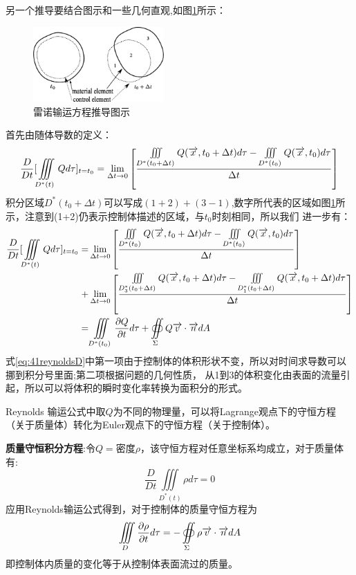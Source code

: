 另一个推导要结合图示和一些几何直观,如图\ref{fig:412}所示：

\begin{figure}[!ht]
\centering
\includegraphics[width=5cm]{reynolds_derivation_illustration.eps}
\caption{雷诺输运方程推导图示}\label{fig:412}
\end{figure}
首先由随体导数的定义：
\begin{equation}
\frac{D}{Dt}[\iiint\limits_{D^*(t)}Qd\tau]_{t=t_0}=\lim_{\Delta t \to 0} \left[\frac{\iiint\limits_{D^*(t_0+\Delta t)}Q(\overrightarrow{x},t_0+\Delta t) d\tau - \iiint\limits_{D^*(t_0)} Q(\overrightarrow{x},t_0) d\tau  }{\Delta t}\right]
\end{equation}
积分区域$D^*(t_0+\Delta t)$可以写成$(1+2)+(3-1)$,数字所代表的区域如图\ref{fig:412}所示，注意到(1+2)仍表示控制体描述的区域，与$t_0$时刻相同，所以我们
进一步有：
\begin{align}\label{eq:41reynoldsD}
\frac{D}{Dt}[\iiint\limits_{D^*(t)}Qd\tau]_{t=t_0}=&\lim_{\Delta t \to 0} \left[
\frac{\iiint\limits_{D^*(t_0)}Q(\overrightarrow{x},t_0+\Delta t) d\tau - \iiint\limits_{D^*(t_0)} Q(\overrightarrow{x},t_0) d\tau  }{\Delta t}
\right]\nonumber\\
+&\lim_{\Delta t \to 0}\left[\frac{\iiint\limits_{D^*_3(t_0+\Delta t)}Q(\overrightarrow{x},t_0+\Delta t) d\tau - \iiint\limits_{D^*_1(t_0+\Delta t)} Q(\overrightarrow{x},t_0+\Delta t) d\tau  }{\Delta t}
\right]\nonumber\\
=& \iiint\limits_{D^*(t_0)}\frac{\partial Q}{\partial t} d\tau + \oiint\limits_{\Sigma} Q\overrightarrow{v} \cdot \overrightarrow{n} dA
\end{align}
式\eqref{eq:41reynoldsD}中第一项由于控制体的体积形状不变，所以对时间求导数可以挪到积分号里面;第二项根据问题的几何性质，
从1到3的体积变化由表面的流量引起，所以可以将体积的瞬时变化率转换为面积分的形式。

Reynolds 输运公式中取$Q$为不同的物理量，可以将Lagrange观点下的守恒方程（关于质量体）转化为Euler观点下的守恒方程（关于控制体）。

\textbf{质量守恒积分方程}:令$Q=$密度$\rho$，该守恒方程对任意坐标系均成立，对于质量体有:
\begin{equation}
\frac{D}{Dt} \iiint\limits_{D^*(t)}\rho d\tau =0
\end{equation}
应用Reynolds输运公式得到，对于控制体的质量守恒方程为
\begin{equation}\label{eq:41Conti}
\iiint\limits_{D}\frac{\partial \rho}{\partial t} d\tau = - \oiint\limits_{\Sigma} \rho \overrightarrow{v}\cdot \overrightarrow{n} dA
\end{equation}
即控制体内质量的变化等于从控制体表面流过的质量。

